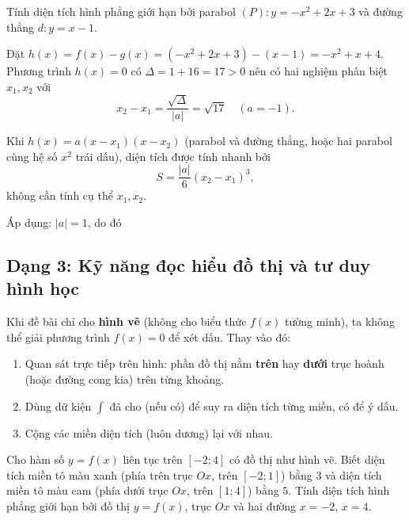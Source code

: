 \begin{hopvidu}
Tính diện tích hình phẳng giới hạn bởi parabol $(P): y=-x^2+2x+3$ và đường thẳng $d: y=x-1$.
\end{hopvidu}
\begin{loigiai}
Đặt $h(x)=f(x)-g(x)=(-x^2+2x+3)-(x-1)=-x^2+x+4$. Phương trình $h(x)=0$ có $\Delta = 1+16=17>0$ nên có hai nghiệm phân biệt $x_1,x_2$ với
\[
x_2-x_1 = \frac{\sqrt\Delta}{|a|}=\sqrt{17} \quad (a=-1).
\]
\begin{hopchuy}
Khi $h(x)=a(x-x_1)(x-x_2)$ (parabol và đường thẳng, hoặc hai parabol cùng hệ số $x^2$ trái dấu), diện tích được tính nhanh bởi
\[
S=\frac{|a|}{6}(x_2-x_1)^3,
\]
không cần tính cụ thể $x_1,x_2$.
\end{hopchuy}
Áp dụng: $|a|=1$, do đó
\end{loigiai}

\newpage
\subsection{Dạng 3: Kỹ năng đọc hiểu đồ thị và tư duy hình học}

\begin{hopphuongphap}
Khi đề bài chỉ cho \textbf{hình vẽ} (không cho biểu thức $f(x)$ tường minh), ta không thể giải phương trình $f(x)=0$ để xét dấu. Thay vào đó:
\begin{enumerate}[leftmargin=1cm]
  \item Quan sát trực tiếp trên hình: phần đồ thị nằm \textbf{trên} hay \textbf{dưới} trục hoành (hoặc đường cong kia) trên từng khoảng.
  \item Dùng dữ kiện $\displaystyle\int$ đã cho (nếu có) để suy ra diện tích từng miền, có để ý dấu.
  \item Cộng các miền diện tích (luôn dương) lại với nhau.
\end{enumerate}
\end{hopphuongphap}

\begin{hopvidu}
Cho hàm số $y=f(x)$ liên tục trên $[-2;4]$ có đồ thị như hình vẽ. Biết diện tích miền tô màu xanh (phía trên trục $Ox$, trên $[-2;1]$) bằng $3$ và diện tích miền tô màu cam (phía dưới trục $Ox$, trên $[1;4]$) bằng $5$. Tính diện tích hình phẳng giới hạn bởi đồ thị $y=f(x)$, trục $Ox$ và hai đường $x=-2$, $x=4$.
\end{hopvidu}

